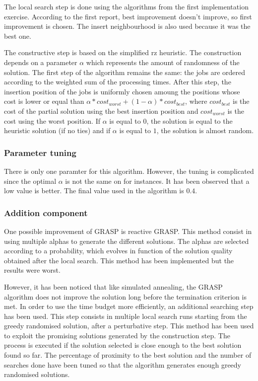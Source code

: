 \documentclass{article}
\begin{document}
The local search step is done using the algorithms from the first implementation exercise.
According to the first report, best improvement doesn't improve, so first improvement is chosen.
The insert neighbourhood is also used because it was the best one.\newline

The constructive step is based on the simplified rz heuristic.
The construction depends on a parameter $\alpha$ which represents the amount of randomness of the solution.
The first step of the algorithm remains the same: the jobs are ordered according to the weighted sum of the processing times.
After this step, the insertion position of the jobs is uniformly chosen amoung the positions whose cost is lower or equal than $\alpha*cost_{worst} + (1-\alpha)*cost_{best}$, where $cost_{best}$ is the cost of the partial solution using the best insertion position and $cost_{worst}$ is the cost using the worst position.
If $\alpha$ is equal to $0$, the solution is equal to the heuristic solution (if no ties) and if $\alpha$ is equal to $1$, the solution is almost random.

\subsubsection{Parameter tuning}

There is only one paramter for this algorithm.
However, the tuning is complicated since the optimal $\alpha$ is not the same on for instances.
It has been observed that a low value is better.
The final value used in the algorithm is $0.4$.

\subsubsection{Addition component}

One possible improvement of GRASP is reactive GRASP.
This method consist in using multiple alphas to generate the different solutions.
The alphas are selected according to a probability, which evolves in function of the solution quality obtained after the local search.
This method has been implemented but the results were worst.\newline

However, it has been noticed that like simulated annealing, the GRASP algorithm does not improve the solution long before the termination criterion is met.
In order to use the time budget more efficiently, an additional searching step has been used.
This step consists in multiple local search runs starting from the greedy randomised solution, after a perturbative step.
This method has been used to exploit the promising solutions generated by the construction step.
The process is executed if the solution selected is close enough to the best solution found so far.
The percentage of proximity to the best solution and the number of searches done have been tuned so that the algorithm generates enough greedy randomised solutions.\newline
\end{document}
